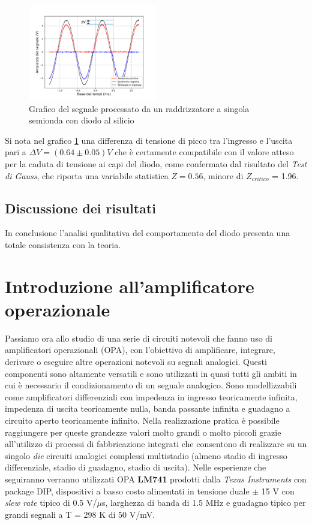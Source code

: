 \documentclass[journal]{IEEEtran}
\begin{document}
\begin{figure}[H]%
\begin {center}
\includegraphics[width=0.50\textwidth]{analysis/output/half-wave-rectifier.pdf}
\caption{Grafico del segnale processato da un raddrizzatore a singola semionda con diodo al silicio}
\label{fig:half-wave}
\end {center}
\end{figure}


Si nota nel grafico \ref{fig:half-wave} una differenza di tensione di picco tra l'ingresso e l'uscita pari a $\Delta V = (0.64 \pm 0.05) V$ che è certamente compatibile con il valore atteso per la caduta di tensione ai capi del diodo, come confermato dal risultato del \textit{Test di Gauss}, che riporta una variabile statistica $Z = 0.56$, minore di $Z_{critico}$ = 1.96.
\subsection{\textbf{Discussione dei risultati}}
In conclusione l'analisi qualitativa del comportamento del diodo presenta una totale consistenza con la teoria.


\section{\textbf{Introduzione all'amplificatore operazionale}}
Passiamo ora allo studio di una serie di circuiti notevoli che fanno uso di amplificatori operazionali (OPA), con l'obiettivo di amplificare, integrare, derivare o eseguire altre operazioni notevoli su segnali analogici. Questi componenti sono altamente versatili e sono utilizzati in quasi tutti gli ambiti in cui è necessario il condizionamento di un segnale analogico. Sono modellizzabili come amplificatori differenziali con impedenza in ingresso teoricamente infinita, impedenza di uscita teoricamente nulla, banda passante infinita e guadagno a circuito aperto teoricamente infinito. Nella realizzazione pratica è possibile raggiungere per queste grandezze valori molto grandi o molto piccoli grazie all'utilizzo di processi di fabbricazione integrati che consentono di realizzare su un singolo \textit{die} circuiti analogici complessi multistadio (almeno stadio di ingresso differenziale, stadio di guadagno, stadio di uscita). Nelle esperienze che seguiranno verranno utilizzati OPA \textbf{LM741} prodotti dalla \textit{Texas Instruments} con package DIP, dispositivi a basso costo alimentati in tensione duale $\pm$ 15 V con \textit{slew rate} tipico di 0.5 V/$\mu$s, larghezza di banda di 1.5 MHz e guadagno tipico per grandi segnali a T = 298 K di 50 V/mV. \cite{H}
\end{document}
